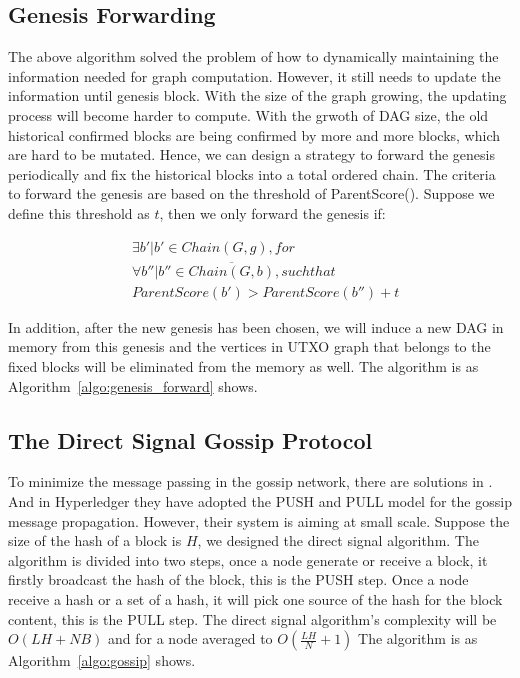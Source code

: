 \subsection{Genesis Forwarding}
The above algorithm solved the problem of how to dynamically maintaining the information needed for graph computation.
However, it still needs to update the information until genesis block. 
With the size of the graph growing, the updating process will become harder to compute.
With the grwoth of DAG size, the old historical confirmed blocks are being confirmed by more and more blocks, which are hard to be mutated.
Hence, we can design a strategy to forward the genesis periodically and fix the historical blocks into a total ordered chain.
The criteria to forward the genesis are based on the threshold of ParentScore().
Suppose we define this threshold as $t$, then we only forward the genesis if: 

\begin{equation}
    \begin{flalign*}
        & \exists b' | b' \in Chain(G, g), for \\ 
        & \forall b'' | b'' \in \overline{Chain(G,b)}, such that \\
        & ParentScore(b') > ParentScore(b'') + t 
    \end{flalign*}
\end{equation}

In addition, after the new genesis has been chosen, 
we will induce a new DAG in memory from this genesis 
and the vertices in UTXO graph that belongs to the fixed blocks will be eliminated from the memory as well.  
The algorithm is as Algorithm~\ref{algo:genesis_forward} shows.




\subsection{The Direct Signal Gossip Protocol}
To minimize the message passing in the gossip network,
there are solutions in \cite{demers1988epidemic}. And in Hyperledger \cite{androulaki2018hyperledger}
they have adopted the PUSH and PULL model for the gossip message propagation. However, their system is aiming at small scale.
Suppose the size of the hash of a block is $H$, we designed the direct signal algorithm.
The algorithm is divided into two steps, once a node generate or receive a block,
it firstly broadcast the hash of the block, this is the PUSH step.
Once a node receive a hash or a set of a hash,
it will pick one source of the hash for the block content, this is the PULL step.
The direct signal algorithm's complexity will be $O(LH + NB)$ and for a node averaged to $O(\frac{LH}{N} + 1)$
The algorithm is as Algorithm~\ref{algo:gossip} shows.


